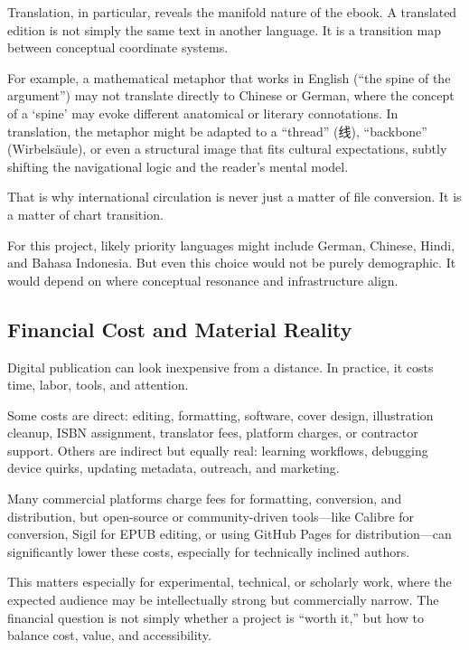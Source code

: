 \documentclass[
]{article}
\begin{document}
Translation, in particular, reveals the manifold nature of the ebook. A
translated edition is not simply the same text in another language. It
is a transition map between conceptual coordinate systems.

For example, a mathematical metaphor that works in English (``the spine
of the argument'') may not translate directly to Chinese or German,
where the concept of a `spine' may evoke different anatomical or
literary connotations. In translation, the metaphor might be adapted to
a ``thread'' (线), ``backbone'' (Wirbelsäule), or even a structural
image that fits cultural expectations, subtly shifting the navigational
logic and the reader's mental model.

That is why international circulation is never just a matter of file
conversion. It is a matter of chart transition.

For this project, likely priority languages might include German,
Chinese, Hindi, and Bahasa Indonesia. But even this choice would not be
purely demographic. It would depend on where conceptual resonance and
infrastructure align.

\hypertarget{financial-cost-and-material-reality}{%
\subsection{Financial Cost and Material
Reality}\label{financial-cost-and-material-reality}}

Digital publication can look inexpensive from a distance. In practice,
it costs time, labor, tools, and attention.

Some costs are direct: editing, formatting, software, cover design,
illustration cleanup, ISBN assignment, translator fees, platform
charges, or contractor support. Others are indirect but equally real:
learning workflows, debugging device quirks, updating metadata,
outreach, and marketing.

Many commercial platforms charge fees for formatting, conversion, and
distribution, but open-source or community-driven tools---like Calibre
for conversion, Sigil for EPUB editing, or using GitHub Pages for
distribution---can significantly lower these costs, especially for
technically inclined authors.

This matters especially for experimental, technical, or scholarly work,
where the expected audience may be intellectually strong but
commercially narrow. The financial question is not simply whether a
project is ``worth it,'' but how to balance cost, value, and
accessibility.
\end{document}
